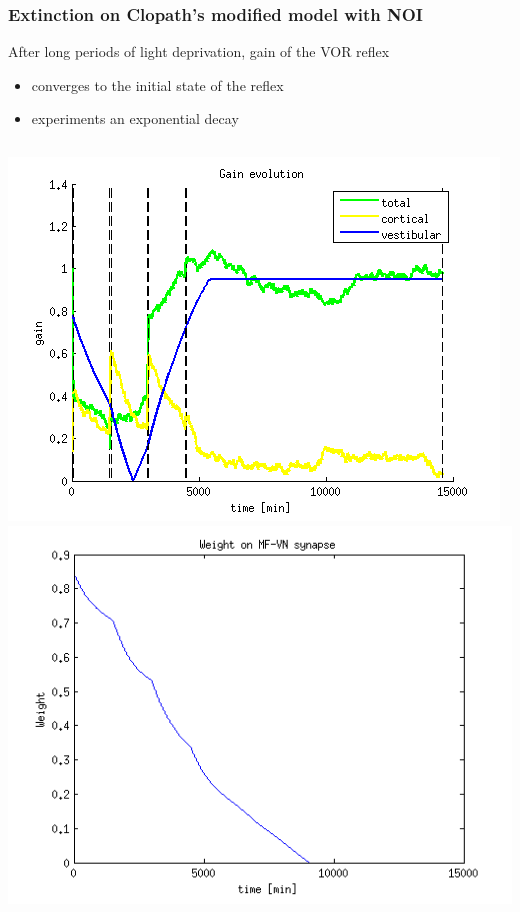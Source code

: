 \documentclass[10pt, compress]{beamer}
\begin{document}
\begin{frame}[fragile]
  \frametitle{Extinction on Clopath's modified model with NOI}
  After long periods of light deprivation, gain of the VOR reflex
  \begin{itemize}
    \item converges to the initial state of the reflex
    \item experiments an exponential decay
  \end{itemize}
  \begin{columns}[onlytextwidth]
      \includegraphics[scale=0.4]{../../simulations/parametric/html/longnoidifference_27.png}
      \includegraphics[scale=0.4]{../../simulations/parametric/html/longnoidifference_29.png}
  \end{columns}
\end{frame}
\end{document}
